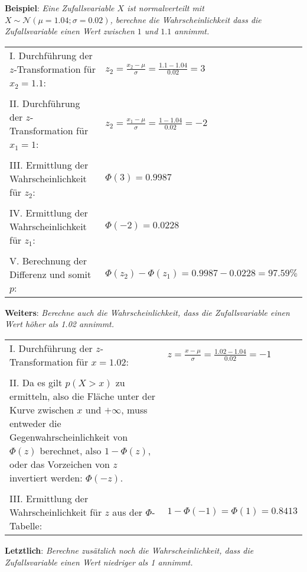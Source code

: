 \textbf{Beispiel}: \emph{Eine Zufallsvariable $X$ ist normalverteilt mit $X \sim \mathcal{N}(\mu=1.04; \sigma=0.02)$, berechne die Wahrscheinlichkeit dass die Zufallsvariable einen Wert zwischen $1$ und $1.1$ annimmt.}

\begin{table}[h!]
	\begin{tabular}{l l}
	I. Durchf\"{u}hrung der $z$-Transformation f\"{u}r $x_{2} = 1.1$: & $z_{2} = \frac{x_{2} - \mu}{\sigma} = \frac{1.1 - 1.04}{0.02} = 3$
	\\ & \\
	II. Durchf\"{u}hrung der $z$-Transformation f\"{u}r $x_{1} = 1$: & $z_{2} = \frac{x_{1} - \mu}{\sigma} = \frac{1 - 1.04}{0.02} = -2$
	\\ & \\
	III. Ermittlung der Wahrscheinlichkeit f\"{u}r $z_{2}$: & $\Phi(3) = 0.9987$
	\\ & \\
	IV. Ermittlung der Wahrscheinlichkeit f\"{u}r $z_{1}$: & $\Phi(-2) = 0.0228$
	\\ & \\
	V. Berechnung der Differenz und somit $p$: & $\Phi(z_{2}) - \Phi(z_{1}) = 0.9987 - 0.0228 = 97.59\%$
	\end{tabular}
\end{table}

\textbf{Weiters}: \emph{Berechne auch die Wahrscheinlichkeit, dass die Zufallsvariable einen Wert h\"{o}her als 1.02 annimmt.}

\begin{table}[h!]
	\begin{tabular}{p{10cm} l}
	I. Durchf\"{u}hrung der $z$-Transformation f\"{u}r $x = 1.02$: & $z = \frac{x - \mu}{\sigma} = \frac{1.02 - 1.04}{0.02} = -1$
	\\ & \\
	II. Da es gilt $p(X > x)$ zu ermitteln, also die Fl\"{a}che unter der Kurve zwischen $x$ und $+\infty$, muss entweder die Gegenwahrscheinlichkeit von $\Phi(z)$ berechnet, also $1 - \Phi(z)$, oder das Vorzeichen von $z$ invertiert werden: $\Phi(-z)$. &
	\\ & \\
	III. Ermittlung der Wahrscheinlichkeit f\"{u}r $z$ aus der $\Phi$-Tabelle: & $1 - \Phi(-1) = \Phi(1) = 0.8413$
	\end{tabular}
\end{table}

\textbf{Letztlich}: \emph{Berechne zus\"{a}tzlich noch die Wahrscheinlichkeit, dass die Zufallsvariable einen Wert niedriger als 1 annimmt.}

